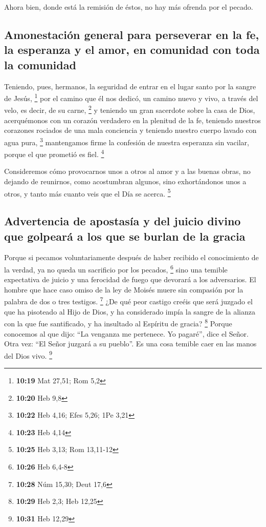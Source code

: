 Ahora bien, donde está la remisión de éstos, no hay más
ofrenda por el pecado.

\hypertarget{amonestaciuxf3n-general-para-perseverar-en-la-fe-la-esperanza-y-el-amor-en-comunidad-con-toda-la-comunidad}{%
\subsection{Amonestación general para perseverar en la fe, la esperanza
y el amor, en comunidad con toda la
comunidad}\label{amonestaciuxf3n-general-para-perseverar-en-la-fe-la-esperanza-y-el-amor-en-comunidad-con-toda-la-comunidad}}

 Teniendo, pues, hermanos, la seguridad de entrar en el
lugar santo por la sangre de Jesús, \footnote{\textbf{10:19} Mat 27,51;
  Rom 5,2}  por el camino que él nos dedicó, un camino
nuevo y vivo, a través del velo, es decir, de su carne, \footnote{\textbf{10:20}
  Heb 9,8}  y teniendo un gran sacerdote sobre la casa de
Dios,  acerquémonos con un corazón verdadero en la
plenitud de la fe, teniendo nuestros corazones rociados de una mala
conciencia y teniendo nuestro cuerpo lavado con agua pura, \footnote{\textbf{10:22}
  Heb 4,16; Efes 5,26; 1Pe 3,21}  mantengamos firme la
confesión de nuestra esperanza sin vacilar, porque el que prometió es
fiel. \footnote{\textbf{10:23} Heb 4,14}

 Consideremos cómo provocarnos unos a otros al amor y a
las buenas obras,  no dejando de reunirnos, como
acostumbran algunos, sino exhortándonos unos a otros, y tanto más cuanto
veis que el Día se acerca. \footnote{\textbf{10:25} Heb 3,13; Rom
  13,11-12}

\hypertarget{advertencia-de-apostasuxeda-y-del-juicio-divino-que-golpearuxe1-a-los-que-se-burlan-de-la-gracia}{%
\subsection{Advertencia de apostasía y del juicio divino que golpeará a
los que se burlan de la
gracia}\label{advertencia-de-apostasuxeda-y-del-juicio-divino-que-golpearuxe1-a-los-que-se-burlan-de-la-gracia}}

 Porque si pecamos voluntariamente después de haber
recibido el conocimiento de la verdad, ya no queda un sacrificio por los
pecados, \footnote{\textbf{10:26} Heb 6,4-8}  sino una
temible expectativa de juicio y una ferocidad de fuego que devorará a
los adversarios.  El hombre que hace caso omiso de la ley
de Moisés muere sin compasión por la palabra de dos o tres testigos.
\footnote{\textbf{10:28} Núm 15,30; Deut 17,6}  ¿De qué
peor castigo creéis que será juzgado el que ha pisoteado al Hijo de
Dios, y ha considerado impía la sangre de la alianza con la que fue
santificado, y ha insultado al Espíritu de gracia? \footnote{\textbf{10:29}
  Heb 2,3; Heb 12,25}  Porque conocemos al que dijo: ``La
venganza me pertenece. Yo pagaré'', dice el Señor. Otra vez: ``El Señor
juzgará a su pueblo''.  Es una cosa temible caer en las
manos del Dios vivo. \footnote{\textbf{10:31} Heb 12,29}

